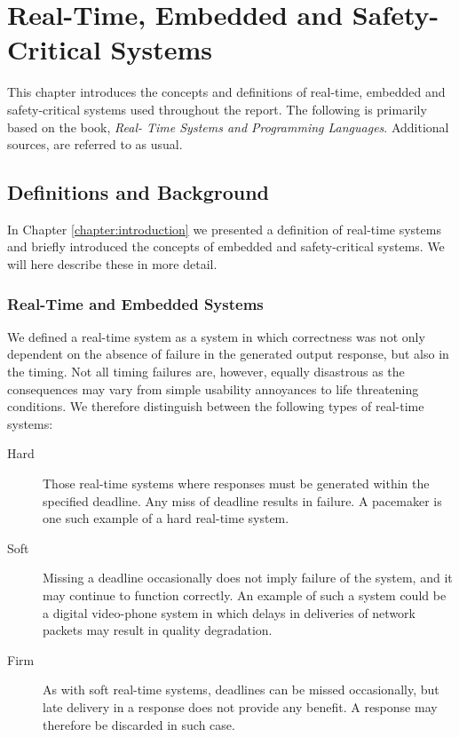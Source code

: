 \chapter{Real-Time, Embedded and Safety-Critical Systems}
\label{chapter:rts}
This chapter introduces the concepts and definitions of real-time, embedded and safety-critical systems used throughout the report. The following is primarily based on the book, \textit{Real- Time Systems and Programming Languages}\cite{alan2001real}. Additional sources, are referred to as usual.

\section{Definitions and Background} %
\label{sec:definitions_and_background}
In Chapter \ref{chapter:introduction} we presented a definition of real-time systems and briefly introduced the concepts of embedded and safety-critical systems. We will here describe these in more detail.

\subsection{Real-Time and Embedded Systems} %
\label{sub:real_time_and_embedded_systems}
We defined a real-time system as a system in which correctness was not only dependent on the absence of failure in the generated output response, but also in the timing. Not all timing failures are, however, equally disastrous as the consequences may vary from simple usability annoyances to life threatening conditions. We therefore distinguish between the following types of real-time systems:
\begin{description}
\item[Hard] Those real-time systems where responses must be generated within the specified deadline. Any miss of deadline results in failure. A pacemaker is one such example of a hard real-time system.
\item[Soft] Missing a deadline occasionally does not imply failure of the system, and it may continue to function correctly. An example of such a system could be a digital video-phone system in which delays in deliveries of network packets may result in quality degradation.
\item[Firm] As with soft real-time systems, deadlines can be missed occasionally, but late delivery in a response does not provide any benefit. A response may therefore be discarded in such case.
\end{description}


